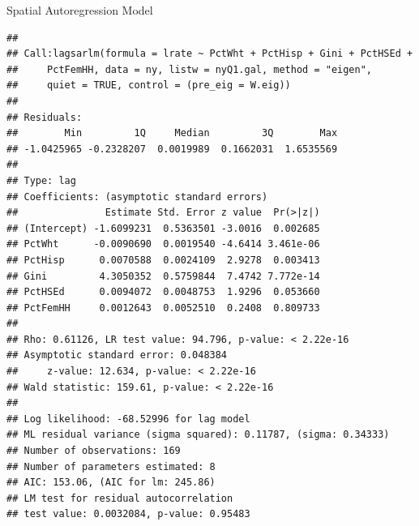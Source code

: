 \documentclass[aspectratio = 169, 12pt]{beamer}\usepackage[]{graphicx}\usepackage[]{color}
\makeatletter
\newenvironment{kframe}{%
 \def\at@end@of@kframe{}%
 \ifinner\ifhmode%
  \def\at@end@of@kframe{\end{minipage}}%
  \begin{minipage}{\columnwidth}%
 \fi\fi%
 \def\FrameCommand##1{\hskip\@totalleftmargin \hskip-\fboxsep
 \colorbox{shadecolor}{##1}\hskip-\fboxsep
     \hskip-\linewidth \hskip-\@totalleftmargin \hskip\columnwidth}%
 \MakeFramed {\advance\hsize-\width
   \@totalleftmargin\z@ \linewidth\hsize
   \@setminipage}}%
 {\par\unskip\endMakeFramed%
 \at@end@of@kframe}
\newenvironment{knitrout}{}{} %
\makeatother
\begin{document}
\begin{frame}[fragile]{Spatial Autoregression Model}
\begin{knitrout}\tiny
{}\color{fgcolor}\begin{kframe}


{\ttfamily\noindent\bfseries\color{errorcolor}{\#\# Error in ogrInfo(dsn = dsn, layer = layer, encoding = encoding, use\_iconv = use\_iconv, : Cannot open data source}}\begin{verbatim}
## 
## Call:lagsarlm(formula = lrate ~ PctWht + PctHisp + Gini + PctHSEd + 
##     PctFemHH, data = ny, listw = nyQ1.gal, method = "eigen", 
##     quiet = TRUE, control = (pre_eig = W.eig))
## 
## Residuals:
##        Min         1Q     Median         3Q        Max 
## -1.0425965 -0.2328207  0.0019989  0.1662031  1.6535569 
## 
## Type: lag 
## Coefficients: (asymptotic standard errors) 
##               Estimate Std. Error z value  Pr(>|z|)
## (Intercept) -1.6099231  0.5363501 -3.0016  0.002685
## PctWht      -0.0090690  0.0019540 -4.6414 3.461e-06
## PctHisp      0.0070588  0.0024109  2.9278  0.003413
## Gini         4.3050352  0.5759844  7.4742 7.772e-14
## PctHSEd      0.0094072  0.0048753  1.9296  0.053660
## PctFemHH     0.0012643  0.0052510  0.2408  0.809733
## 
## Rho: 0.61126, LR test value: 94.796, p-value: < 2.22e-16
## Asymptotic standard error: 0.048384
##     z-value: 12.634, p-value: < 2.22e-16
## Wald statistic: 159.61, p-value: < 2.22e-16
## 
## Log likelihood: -68.52996 for lag model
## ML residual variance (sigma squared): 0.11787, (sigma: 0.34333)
## Number of observations: 169 
## Number of parameters estimated: 8 
## AIC: 153.06, (AIC for lm: 245.86)
## LM test for residual autocorrelation
## test value: 0.0032084, p-value: 0.95483
\end{verbatim}
\end{kframe}
\end{knitrout}
\end{frame}
\end{document}
